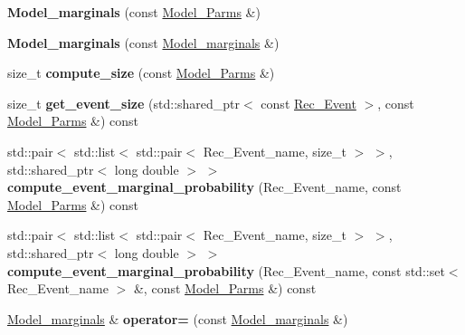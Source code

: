 \begin{DoxyCompactItemize}
\item 
\mbox{\label{classModel__marginals_af39c167e148333d7ef0fbb7e3671e4e6}} 
{\bfseries Model\+\_\+marginals} (const \hyperlink{classModel__Parms}{Model\+\_\+\+Parms} \&)
\item 
\mbox{\label{classModel__marginals_a8940e4e8b183b0a9cc7678dc1c3aac69}} 
{\bfseries Model\+\_\+marginals} (const \hyperlink{classModel__marginals}{Model\+\_\+marginals} \&)
\item 
\mbox{\label{classModel__marginals_abc7cf626d915e7a6a9805b3d2a9e6ddf}} 
size\+\_\+t {\bfseries compute\+\_\+size} (const \hyperlink{classModel__Parms}{Model\+\_\+\+Parms} \&)
\item 
\mbox{\label{classModel__marginals_a97ee1d30aa7638a1a1c3e4362ded1fe4}} 
size\+\_\+t {\bfseries get\+\_\+event\+\_\+size} (std\+::shared\+\_\+ptr$<$ const \hyperlink{classRec__Event}{Rec\+\_\+\+Event} $>$, const \hyperlink{classModel__Parms}{Model\+\_\+\+Parms} \&) const
\item 
\mbox{\label{classModel__marginals_ae4ef378bbec817842572b5538e95899e}} 
std\+::pair$<$ std\+::list$<$ std\+::pair$<$ Rec\+\_\+\+Event\+\_\+name, size\+\_\+t $>$ $>$, std\+::shared\+\_\+ptr$<$ long double $>$ $>$ {\bfseries compute\+\_\+event\+\_\+marginal\+\_\+probability} (Rec\+\_\+\+Event\+\_\+name, const \hyperlink{classModel__Parms}{Model\+\_\+\+Parms} \&) const
\item 
\mbox{\label{classModel__marginals_a2e60c477a567ee76de8f0e7ec6929364}} 
std\+::pair$<$ std\+::list$<$ std\+::pair$<$ Rec\+\_\+\+Event\+\_\+name, size\+\_\+t $>$ $>$, std\+::shared\+\_\+ptr$<$ long double $>$ $>$ {\bfseries compute\+\_\+event\+\_\+marginal\+\_\+probability} (Rec\+\_\+\+Event\+\_\+name, const std\+::set$<$ Rec\+\_\+\+Event\+\_\+name $>$ \&, const \hyperlink{classModel__Parms}{Model\+\_\+\+Parms} \&) const
\item 
\mbox{\label{classModel__marginals_a9791d1f5adb5a336b02b39129618990a}} 
\hyperlink{classModel__marginals}{Model\+\_\+marginals} \& {\bfseries operator=} (const \hyperlink{classModel__marginals}{Model\+\_\+marginals} \&)

\end{DoxyCompactItemize}
